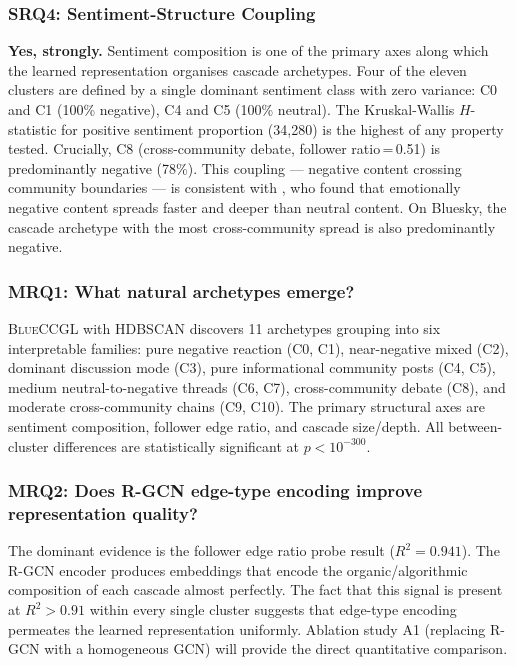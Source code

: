 \documentclass[12pt, a4paper]{article}
\newcommand{\BLUECCGL}{\textsc{BlueCCGL}\xspace}
\begin{document}
\subsubsection*{SRQ4: Sentiment-Structure Coupling}

\textbf{Yes, strongly.} Sentiment composition is one of the primary axes along which the learned representation organises cascade archetypes. Four of the eleven clusters are defined by a single dominant sentiment class with zero variance: C0 and C1 (100\% negative), C4 and C5 (100\% neutral). The Kruskal-Wallis $H$-statistic for positive sentiment proportion (34,280) is the highest of any property tested. Crucially, C8 (cross-community debate, follower ratio\,=\,0.51) is predominantly negative (78\%). This coupling --- negative content crossing community boundaries --- is consistent with \citet{vosoughi2018spread}, who found that emotionally negative content spreads faster and deeper than neutral content. On Bluesky, the cascade archetype with the most cross-community spread is also predominantly negative.

\subsubsection*{MRQ1: What natural archetypes emerge?}

\BLUECCGL with HDBSCAN discovers 11 archetypes grouping into six interpretable families: pure negative reaction (C0, C1), near-negative mixed (C2), dominant discussion mode (C3), pure informational community posts (C4, C5), medium neutral-to-negative threads (C6, C7), cross-community debate (C8), and moderate cross-community chains (C9, C10). The primary structural axes are sentiment composition, follower edge ratio, and cascade size/depth. All between-cluster differences are statistically significant at $p < 10^{-300}$.

\subsubsection*{MRQ2: Does R-GCN edge-type encoding improve representation quality?}

The dominant evidence is the follower edge ratio probe result ($R^2 = 0.941$). The R-GCN encoder produces embeddings that encode the organic/algorithmic composition of each cascade almost perfectly. The fact that this signal is present at $R^2 > 0.91$ within every single cluster suggests that edge-type encoding permeates the learned representation uniformly. Ablation study A1 (replacing R-GCN with a homogeneous GCN) will provide the direct quantitative comparison.
\end{document}
